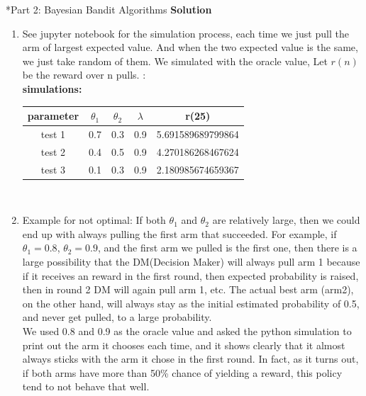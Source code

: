 \documentclass{article}
\newcommand{\solution}{\textbf{\Large Solution}}
\begin{document}
\begin{homeworkProblem}*{Part 2: Bayesian Bandit Algorithms}
    \solution
    \begin{enumerate}[1.]
        \item
        See jupyter notebook for the simulation process, each time we just pull the arm of largest expected value. And when the two expected value is the same, we just take random of them. We simulated with the oracle value, Let $r(n)$ be the reward over n pulls. :\\
        \textbf{simulations:}\\
        \begin{tabular}[t]{|c|c|c|c|c|}
        \hline
        parameter & $\theta_1$ & $\theta_2$ & $\lambda$ & r(25) \\
        \hline
        test 1 & 0.7 & 0.3 & 0.9 & 5.691589689799864 \\
        \hline
        test 2 & 0.4 & 0.5 & 0.9 & 4.270186268467624 \\
        \hline
        test 3 & 0.1 & 0.3 & 0.9 & 2.180985674659367 \\
        \hline
        \end{tabular}\\
        \item
        Example for not optimal: If both $\theta_1$ and $\theta_2$ are relatively large, then we could end up with always pulling the first arm that succeeded.
        For example, if $\theta_1 = 0.8$, $\theta_2 = 0.9$, and the first arm we pulled is the first one, then there is a large possibility that the DM(Decision Maker) will always pull arm 1 because if it receives an reward in the first round, then expected probability is raised, then in round 2 DM will again pull arm 1, etc. The actual best arm (arm2), on the other hand, will always stay as the initial estimated probability of 0.5, and never get pulled, to a large probability.\\
        We used 0.8 and 0.9 as the oracle value and asked the python simulation to print out the arm it chooses each time, and it shows clearly that it almost always sticks with the arm it chose in the first round.
        In fact, as it turns out, if both arms have more than 50\% chance of yielding a reward, this policy tend to not behave that well.


\end{enumerate}
\end{homeworkProblem}
\end{document}
